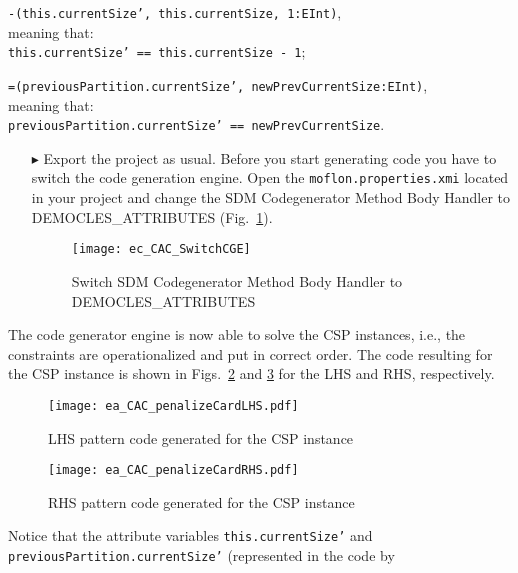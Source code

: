 \texttt{\small-(this.currentSize', this.currentSize, 1:EInt)},\\
meaning that:\\
 \texttt{\small this.currentSize' == this.currentSize - 1};

\texttt{\small=(previousPartition.currentSize', newPrevCurrentSize:EInt)},\\
meaning that:\\
 \texttt{\small previousPartition.currentSize' == newPrevCurrentSize}.
\begin{itemize}    
\item[$\blacktriangleright$] Export the project as usual. Before you start generating code you have to switch the code generation engine. Open the \texttt{moflon.properties.xmi} located in your project and change the \textsf{SDM Codegenerator Method Body Handler} to  \textsf{DEMOCLES\_ATTRIBUTES} (Fig.~\ref{ec_CAC_SwitchCGE}).

\begin{figure}[htbp]
\begin{center}
  \texttt{[image: ec\_CAC\_SwitchCGE]}
  \caption{Switch \textsf{SDM Codegenerator Method Body Handler} to \textsf{DEMOCLES\_ATTRIBUTES}}  
  \label{ec_CAC_SwitchCGE}
\end{center}
\end{figure}

\end{itemize}
The code generator engine is now able to solve the CSP instances, i.e., the constraints are operationalized and put in correct order. 
The code resulting for the CSP instance is shown in Figs.~\ref{ea_CAC_penalizeCardLHS} and \ref{ea_CAC_penalizeCardRHS} for the LHS and RHS, respectively.
\begin{figure}[htbp]
\begin{center}
  \texttt{[image: ea\_CAC\_penalizeCardLHS.pdf]}
  \caption{LHS pattern code generated for the CSP instance}  
  \label{ea_CAC_penalizeCardLHS}
\end{center}
\end{figure}
\begin{figure}[htbp]
\begin{center}
  \texttt{[image: ea\_CAC\_penalizeCardRHS.pdf]}
  \caption{RHS pattern code generated for the CSP instance}  
  \label{ea_CAC_penalizeCardRHS}
\end{center}
\end{figure}
Notice that the attribute variables \texttt{this.currentSize'} and \texttt{previousPartition.currentSize'} (represented in the code by \\ 

